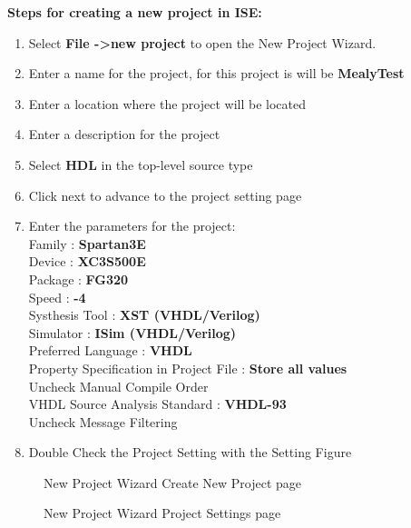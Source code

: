 \documentclass{article}
\begin{document}
\textbf{Steps for creating a new project in ISE:}
\begin{enumerate}
  \item Select \textbf{File -\textgreater new project} to open the New Project Wizard.
  \item Enter a name for the project, for this project is will be \textbf{MealyTest}
  \item Enter a location where the project will be located
  \item Enter a description for the project
  \item Select \textbf{HDL} in the top-level source type
  \item Click next to advance to the project setting page
  \item Enter the parameters for the project: \hfill \\
  Family : \textbf{Spartan3E}\\
  Device : \textbf{XC3S500E}\\
  Package : \textbf{FG320}\\
  Speed  : \textbf{-4}\\
  Systhesis Tool : \textbf{XST (VHDL/Verilog)}\\
  Simulator : \textbf{ISim (VHDL/Verilog)}\\
  Preferred Language : \textbf{VHDL}\\
  Property Specification in Project File : \textbf{Store all values}\\
  Uncheck Manual Compile Order\\
  VHDL Source Analysis Standard : \textbf{VHDL-93}\\
  Uncheck Message Filtering
  \item Double Check the Project Setting with the Setting Figure
\end{enumerate}

\newpage %

\begin{figure}[!htb]
  \centering
  \caption{New Project Wizard Create New Project page}
\end{figure}

\begin{figure}[!htb]
  \centering
  \caption{New Project Wizard Project Settings page}
\end{figure}
\end{document}
